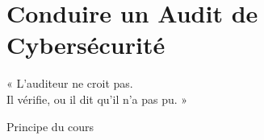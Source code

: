 
\chapter{Conduire un Audit de Cybersécurité}
\label{chap:audit}

\epigraph{%
    « L'auditeur ne croit pas.\\
    Il vérifie, ou il dit qu'il n'a pas pu. »%
}{Principe du cours}


